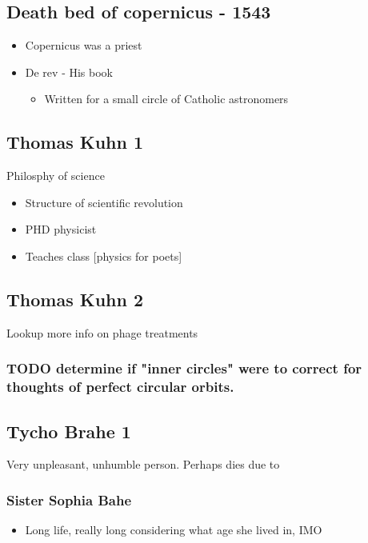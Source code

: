 \documentclass[11pt]{article}
\begin{document}
\subsection{Death bed of copernicus - 1543}
\label{sec-10-1}
\begin{itemize}
\item Copernicus was a priest
\item De rev - His book
\begin{itemize}
\item Written for a small circle of Catholic astronomers
\end{itemize}
\end{itemize}

\subsection{Thomas Kuhn 1}
\label{sec-10-2}
Philosphy of science
\begin{itemize}
\item Structure of scientific revolution
\item PHD physicist
\item Teaches class [physics for poets]
\end{itemize}

\subsection{Thomas Kuhn 2}
\label{sec-10-3}
Lookup more info on phage treatments

\subsubsection{{\bfseries\sffamily TODO} determine if "inner circles" were to correct for thoughts of perfect circular orbits.}
\label{sec-10-3-1}

\subsection{Tycho Brahe 1}
\label{sec-10-4}
Very unpleasant, unhumble person. Perhaps dies due to 
\subsubsection{Sister Sophia Bahe}
\label{sec-10-4-1}
\begin{itemize}
\item Long life, really long considering what age she lived in, IMO
\end{itemize}
\end{document}
